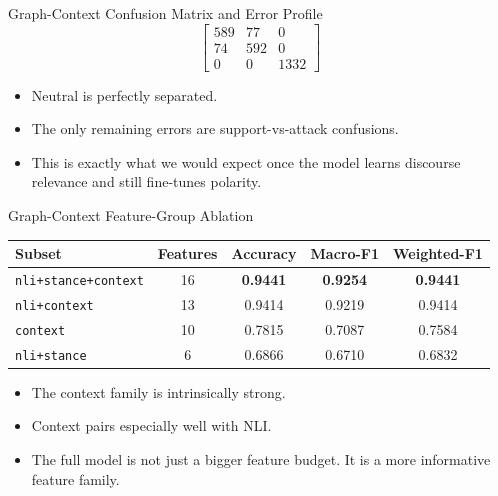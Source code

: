 \documentclass[aspectratio=169, 10pt]{beamer}
\begin{document}
\begin{frame}{Graph-Context Confusion Matrix and Error Profile}
\[
\begin{bmatrix}
589 & 77 & 0 \\
74 & 592 & 0 \\
0 & 0 & 1332
\end{bmatrix}
\]

\begin{itemize}
  \item Neutral is perfectly separated.
  \item The only remaining errors are support-vs-attack confusions.
  \item This is exactly what we would expect once the model learns discourse relevance and still fine-tunes polarity.
\end{itemize}
\end{frame}

\begin{frame}{Graph-Context Feature-Group Ablation}
\begin{center}
\begin{tabular}{lcccc}
\toprule
Subset & Features & Accuracy & Macro-F1 & Weighted-F1 \\
\midrule
\texttt{nli+stance+context} & 16 & \textbf{0.9441} & \textbf{0.9254} & \textbf{0.9441} \\
\texttt{nli+context} & 13 & 0.9414 & 0.9219 & 0.9414 \\
\texttt{context} & 10 & 0.7815 & 0.7087 & 0.7584 \\
\texttt{nli+stance} & 6 & 0.6866 & 0.6710 & 0.6832 \\
\bottomrule
\end{tabular}
\end{center}

\begin{itemize}
  \item The context family is intrinsically strong.
  \item Context pairs especially well with NLI.
  \item The full model is not just a bigger feature budget. It is a more informative feature family.
\end{itemize}
\end{frame}
\end{document}
